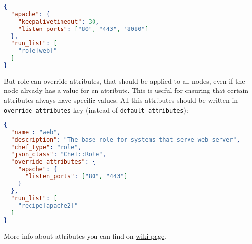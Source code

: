 \begin{lstlisting}[language=JSON,label=lst:my-cloud-attributes3]
{
  "apache": {
    "keepalivetimeout": 30,
    "listen_ports": ["80", "443", "8080"]
  },
  "run_list": [
    "role[web]"
  ]
}
\end{lstlisting}

But role can override attributes, that should be applied to all nodes, even if the node already has a value for an attribute. This is useful for ensuring that certain attributes always have specific values. All this attributes should be written in \lstinline!override_attributes! key (instead of \lstinline!default_attributes!):

\begin{lstlisting}[language=JSON,label=lst:my-cloud-attributes2]
{
  "name": "web",
  "description": "The base role for systems that serve web server",
  "chef_type": "role",
  "json_class": "Chef::Role",
  "override_attributes": {
    "apache": {
      "listen_ports": ["80", "443"]
    }
  },
  "run_list": [
    "recipe[apache2]"
  ]
}
\end{lstlisting}

More info about attributes you can find on \href{http://docs.opscode.com/chef_overview_attributes.html}{wiki page}.